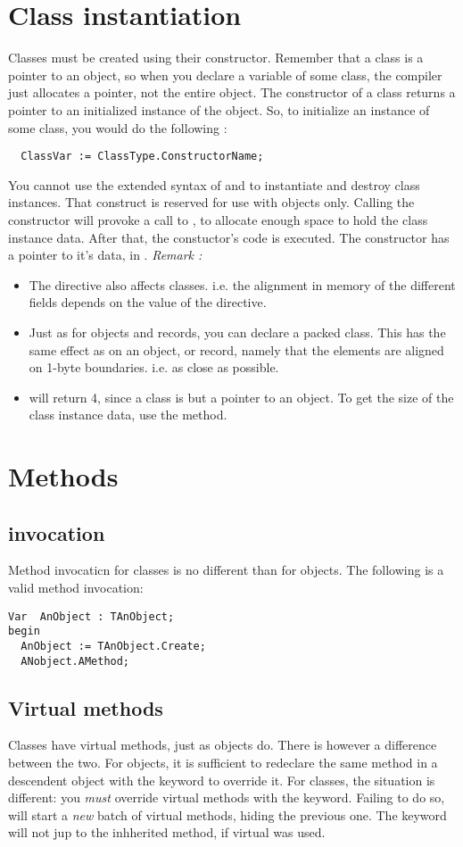 \documentclass{report}
\begin{document}
\section{Class instantiation}
Classes must be created using their constructor. Remember that a class is a
pointer to an object, so when you declare a variable of some class, the
compiler just allocates a pointer, not the entire object. The constructor of
a class returns a pointer to an initialized instance of the object.
So, to initialize an instance of some class, you would do the following :
\begin{verbatim}
  ClassVar := ClassType.ConstructorName;
\end{verbatim}
You cannot use the extended syntax of  and  to
instantiate and destroy class instances.
That construct is reserved for use with objects only.
Calling the constructor will provoke a call to , to allocate
enough space to hold the class instance data.
After that, the constuctor's code is executed.
The constructor has a pointer to it's data, in .
{\em Remark :}
\begin{itemize}
\item The  directive also affects classes.
i.e. the alignment in memory of the different fields depends on the
value of  the  directive.
\item Just as for objects and records, you can declare a packed class.
This has the same effect as on an object, or record, namely that the
elements are aligned on 1-byte boundaries. i.e. as close as possible.
\item {} will return 4, since a class is but a pointer to
an object. To get the size of the class instance data, use the
 method.
\end{itemize}
\section{Methods}
\subsection{invocation}
Method invocaticn for classes is no different than for objects. The
following is a valid method invocation:
\begin{verbatim}
Var  AnObject : TAnObject;
begin
  AnObject := TAnObject.Create;
  ANobject.AMethod;
\end{verbatim}
\subsection{Virtual methods}
Classes have virtual methods, just as objects do. There is however a
difference between the two. For objects, it is sufficient to redeclare the
same method in a descendent object with the keyword  to
override it. For classes, the situation is different: you {\em must}
override virtual methods with the  keyword. Failing to do so,
will start a {\em new} batch of virtual methods, hiding the previous
one.  The  keyword will not jup to the inhherited method, if
virtual was used. 
\end{document}
